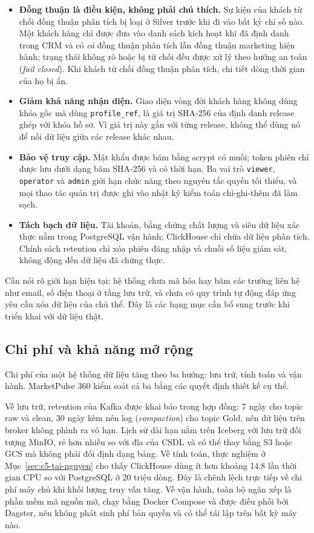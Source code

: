 \begin{itemize}
    \item \textbf{Đồng thuận là điều kiện, không phải chú thích.} Sự kiện của khách từ chối đồng thuận phân tích bị loại ở Silver trước khi đi vào bất kỳ chỉ số nào. Một khách hàng chỉ được đưa vào danh sách kích hoạt khi đã định danh trong CRM và có \emph{cả} đồng thuận phân tích lẫn đồng thuận marketing hiện hành; trạng thái không rõ hoặc bị từ chối đều được xử lý theo hướng an toàn (\emph{fail closed}). Khi khách từ chối đồng thuận phân tích, chi tiết dòng thời gian của họ bị ẩn.
    \item \textbf{Giảm khả năng nhận diện.} Giao diện vòng đời khách hàng không dùng khóa gốc mà dùng \texttt{profile\_ref}, là giá trị SHA-256 của định danh release ghép với khóa hồ sơ. Vì giá trị này gắn với từng release, không thể dùng nó để nối dữ liệu giữa các release khác nhau.
    \item \textbf{Bảo vệ truy cập.} Mật khẩu được băm bằng scrypt có muối; token phiên chỉ được lưu dưới dạng băm SHA-256 và có thời hạn. Ba vai trò \texttt{viewer}, \texttt{operator} và \texttt{admin} giới hạn chức năng theo nguyên tắc quyền tối thiểu, và mọi thao tác quản trị được ghi vào nhật ký kiểm toán chỉ-ghi-thêm đã làm sạch.
    \item \textbf{Tách bạch dữ liệu.} Tài khoản, bằng chứng chất lượng và siêu dữ liệu xác thực nằm trong PostgreSQL vận hành; ClickHouse chỉ chứa dữ liệu phân tích. Chính sách retention chỉ xóa phiên đăng nhập và chuỗi số liệu giám sát, không động đến dữ liệu đã chứng thực.
\end{itemize}

Cần nói rõ giới hạn hiện tại: hệ thống chưa mã hóa hay băm các trường liên hệ như email, số điện thoại ở tầng lưu trữ, và chưa có quy trình tự động đáp ứng yêu cầu xóa dữ liệu của chủ thể. Đây là các hạng mục cần bổ sung trước khi triển khai với dữ liệu thật.

\subsection{Chi phí và khả năng mở rộng}
\label{sec:c6-cost}
Chi phí của một hệ thống dữ liệu tăng theo ba hướng: lưu trữ, tính toán và vận hành. MarketPulse 360 kiểm soát cả ba bằng các quyết định thiết kế cụ thể.

Về lưu trữ, retention của Kafka được khai báo trong hợp đồng: 7 ngày cho topic raw và clean, 30 ngày kèm nén log (\emph{compaction}) cho topic Gold, nên dữ liệu trên broker không phình ra vô hạn. Lịch sử dài hạn nằm trên Iceberg với lưu trữ đối tượng MinIO, rẻ hơn nhiều so với đĩa của CSDL và có thể thay bằng S3 hoặc GCS mà không phải đổi định dạng bảng. Về tính toán, thực nghiệm ở Mục~\ref{sec:c5-tai-nguyen} cho thấy ClickHouse dùng ít hơn khoảng 14,8 lần thời gian CPU so với PostgreSQL ở 20 triệu dòng. Đây là chênh lệch trực tiếp về chi phí máy chủ khi khối lượng truy vấn tăng. Về vận hành, toàn bộ ngăn xếp là phần mềm mã nguồn mở, chạy bằng Docker Compose và được điều phối bởi Dagster, nên không phát sinh phí bản quyền và có thể tái lập trên bất kỳ máy nào.

